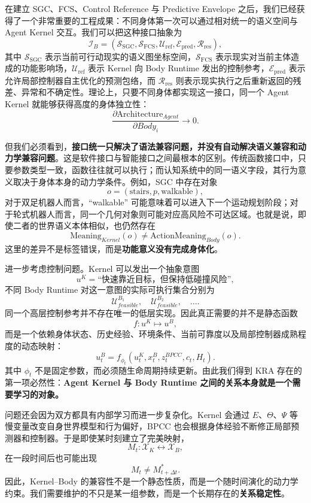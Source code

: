 在建立 SGC、FCS、Control Reference 与 Predictive Envelope 之后，我们已经获得了一个非常重要的工程成果：不同身体第一次可以通过相对统一的语义空间与 Agent Kernel 交互。我们可以把这种接口抽象为
\[
\mathcal I_B
=
\left(
\mathcal S_{\mathrm{SGC}},
\mathcal S_{\mathrm{FCS}},
\mathcal U_{\mathrm{ref}},
\mathcal E_{\mathrm{pred}},
\mathcal R_{\mathrm{res}}
\right),
\]
其中 $\mathcal S_{\mathrm{SGC}}$ 表示当前可行动现实的语义图坐标空间，$\mathcal S_{\mathrm{FCS}}$ 表示现实对当前主体造成的功能影响场，$\mathcal U_{\mathrm{ref}}$ 表示 Kernel 向 Body Runtime 发出的控制参考，$\mathcal E_{\mathrm{pred}}$ 表示允许局部控制器自主优化的预测包络，而 $\mathcal R_{\mathrm{res}}$ 则表示现实执行之后重新返回的残差、异常和不确定性。理论上，只要不同身体都实现这一接口，同一个 Agent Kernel 就能够获得高度的身体独立性：
\[
\frac{\partial \mathrm{Architecture}_{Agent}}
{\partial Body_i}
\rightarrow 0.
\]

但我们必须看到，\textbf{接口统一只解决了语法兼容问题，并没有自动解决语义兼容和动力学兼容问题}。这是软件接口与智能接口之间最根本的区别。传统函数接口中，只要参数类型一致，函数往往就可以执行；而认知系统中的同一语义字段，其行为意义取决于身体本身的动力学条件。例如，SGC 中存在对象
\[
o=(\mathrm{stairs},p,\mathrm{walkable}),
\]
对于双足机器人而言，``walkable'' 可能意味着可以进入下一个运动规划阶段；对于轮式机器人而言，同一个几何对象则可能对应高风险不可达区域。也就是说，即使二者的世界语义本体相似，也仍然存在
\[
\mathrm{Meaning}_{Kernel}(o)
\neq
\mathrm{ActionMeaning}_{Body}(o).
\]
这里的差异不是标签错误，而是\textbf{功能意义没有完成身体化}。

进一步考虑控制问题。Kernel 可以发出一个抽象意图
\[
u^{K}
=
\text{``快速靠近目标，但保持低碰撞风险''},
\]
不同 Body Runtime 对这一意图的实际可执行集合分别为
\[
\mathcal U^{B_1}_{feasible},
\quad
\mathcal U^{B_2}_{feasible},
\quad
\dots .
\]
同一个高层控制参考并不存在唯一的低层实现。因此真正需要的并不是静态函数
\[
f:u^{K}\mapsto u^{B},
\]
而是一个依赖身体状态、历史经验、环境条件、当前可靠度以及局部控制器成熟程度的动态映射：
\[
u^{B}_t
=
f_{\phi_t}
\left(
u^{K}_t,
x^{B}_t,
z^{BPCC}_t,
c_t,
H_t
\right).
\]
其中 $\phi_t$ 不是固定参数，而必须随生命周期持续更新。由此我们得到 KRA 存在的第一项必然性：\textbf{Agent Kernel 与 Body Runtime 之间的关系本身就是一个需要学习的对象。}

问题还会因为双方都具有内部学习而进一步复杂化。Kernel 会通过 $E$、$\Theta$、$\Psi$ 等慢变量改变自身世界模型和行为偏好，BPCC 也会根据身体经验不断修正局部预测器和控制器。于是即使某时刻建立了完美映射，
\[
M_t:
\mathcal X_K
\leftrightarrow
\mathcal X_B,
\]
在一段时间后也可能出现
\[
M_t
\neq
M_{t+\Delta t}^{*}.
\]
因此，Kernel--Body 的兼容性不是一个静态性质，而是一个随时间演化的动力学约束。我们需要维护的不只是某一组参数，而是一个长期存在的\textbf{关系稳定性}。

